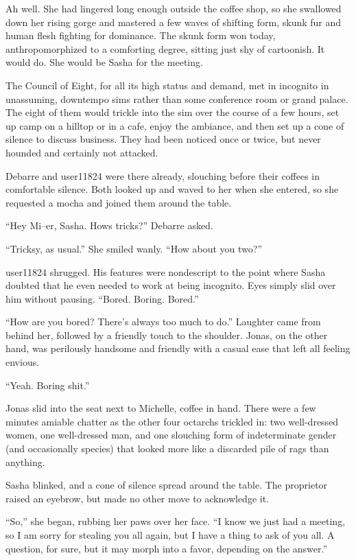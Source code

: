 Ah well. She had lingered long enough outside the coffee shop, so she swallowed down her rising gorge and mastered a few waves of shifting form, skunk fur and human flesh fighting for dominance. The skunk form won today, anthropomorphized to a comforting degree, sitting just shy of cartoonish. It would do. She would be Sasha for the meeting.

The Council of Eight, for all its high status and demand, met in incognito in unassuming, downtempo sims rather than some conference room or grand palace. The eight of them would trickle into the sim over the course of a few hours, set up camp on a hilltop or in a cafe, enjoy the ambiance, and then set up a cone of silence to discuss business. They had been noticed once or twice, but never hounded and certainly not attacked.

Debarre and user11824 were there already, slouching before their coffees in comfortable silence. Both looked up and waved to her when she entered, so she requested a mocha and joined them around the table.

``Hey Mi--er, Sasha. Hows tricks?'' Debarre asked.

``Tricksy, as usual.'' She smiled wanly. ``How about you two?''

user11824 shrugged. His features were nondescript to the point where Sasha doubted that he even needed to work at being incognito. Eyes simply slid over him without pausing. ``Bored. Boring. Bored.''

``How are you bored? There's always too much to do.'' Laughter came from behind her, followed by a friendly touch to the shoulder. Jonas, on the other hand, was perilously handsome and friendly with a casual ease that left all feeling envious.

``Yeah. Boring shit.''

Jonas slid into the seat next to Michelle, coffee in hand. There were a few minutes amiable chatter as the other four octarchs trickled in: two well-dressed women, one well-dressed man, and one slouching form of indeterminate gender (and occasionally species) that looked more like a discarded pile of rags than anything.

Sasha blinked, and a cone of silence spread around the table. The proprietor raised an eyebrow, but made no other move to acknowledge it.

``So,'' she began, rubbing her paws over her face. ``I know we just had a meeting, so I am sorry for stealing you all again, but I have a thing to ask of you all. A question, for sure, but it may morph into a favor, depending on the answer.''

